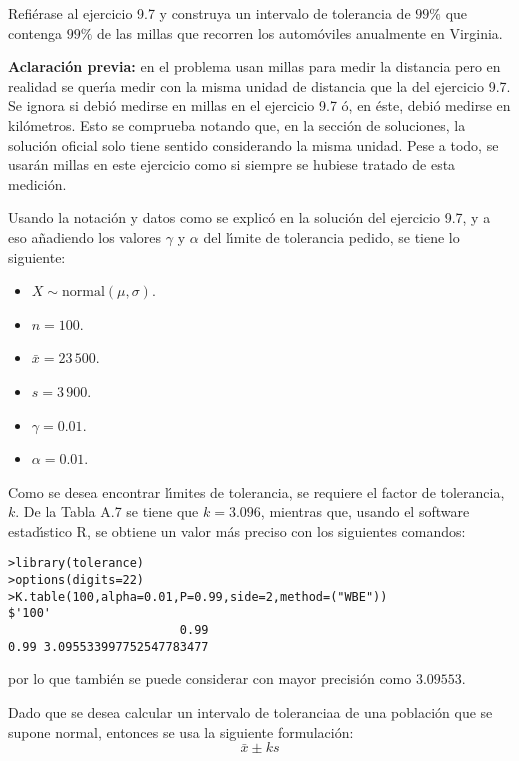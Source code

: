 \begin{enunciado}
 Refi\'erase al ejercicio 9.7 y construya un intervalo de tolerancia de $99\%$ que contenga $99\%$ de las millas que recorren los autom\'oviles anualmente en Virginia.
\end{enunciado}

\begin{solucion}
 \textbf{Aclaración previa:} en el problema usan millas para medir la distancia pero en realidad se quer\'{\i}a medir con la misma unidad de distancia que la del ejercicio 9.7. Se ignora si debi\'o medirse en millas en el ejercicio 9.7 \'o, en \'este, debi\'o medirse en kil\'ometros. Esto se comprueba notando que, en la secci\'on de soluciones, la soluci\'on oficial solo tiene sentido considerando la misma unidad. Pese a todo, se usar\'an millas en este ejercicio como si siempre se hubiese tratado de esta medici\'on.
 \par 
 Usando la notaci\'on y datos como se explic\'o en la soluci\'on del ejercicio 9.7, y a eso a\~nadiendo los valores $\gamma$ y $\alpha$ del l\'{\i}mite de tolerancia pedido, se tiene lo siguiente:
 \begin{itemize}
  \item $X\sim\text{normal}(\mu,\sigma)$.
  \item $n=100$.
  \item $\bar{x}=23\,500$.
  \item $s=3\,900$.
  \item $\gamma=0.01$.
  \item $\alpha=0.01$.
 \end{itemize}
 Como se desea encontrar l\'{\i}mites de tolerancia, se requiere el factor de tolerancia, $k$. De la Tabla A.7 se tiene que $k=3.096$, mientras que, usando el software estad\'{\i}stico R, se obtiene un valor m\'as preciso con los siguientes comandos:
 \begin{verbatim}
>library(tolerance)
>options(digits=22)
>K.table(100,alpha=0.01,P=0.99,side=2,method=("WBE"))
$'100'
                        0.99
0.99 3.095533997752547783477
 \end{verbatim}
 \vspace{-0.5cm}
 por lo que tambi\'en se puede considerar con mayor precisi\'on como $3.09553$.
 \par
 Dado que se desea calcular un intervalo de toleranciaa de una poblaci\'on que se supone normal, entonces se usa la siguiente formulaci\'on:
 \begin{equation*}
  \bar{x}\pm ks
 \end{equation*}

\end{solucion}

